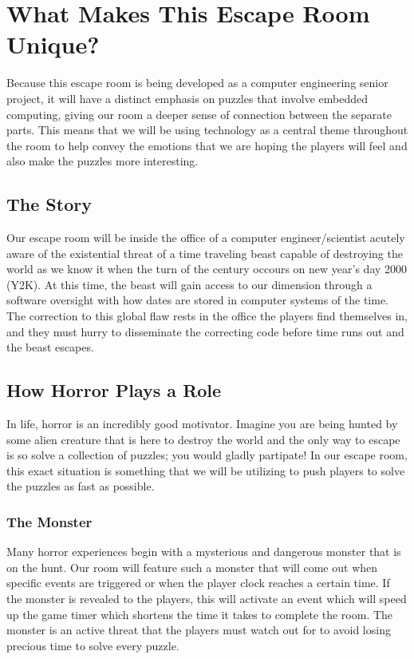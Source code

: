\documentclass[conference]{IEEEtran}
\begin{document}
\section{What Makes This Escape Room Unique?}
Because this escape room is being developed as a computer engineering senior project, it will have a distinct emphasis
on puzzles that involve embedded computing, giving our room a deeper sense of connection between the separate parts.
This means that we will be using technology as a central theme throughout the room to help convey the emotions that we
are hoping the players will feel and also make the puzzles more interesting.

\subsection*{The Story}
Our escape room will be inside the office of a computer engineer/scientist acutely aware of the existential threat 
of a time traveling beast capable of destroying the world as we know it when the turn of the century occours on 
new year's day 2000 (Y2K). At this time, the beast will gain access to our dimension through a software oversight
with how dates are stored in computer systems of the time. The correction to this global flaw rests in the office
the players find themselves in, and they must hurry to disseminate the correcting code before time runs out and the
beast escapes.

\subsection*{How Horror Plays a Role}
In life, horror is an incredibly good motivator. Imagine you are being hunted by some alien creature that is here to
destroy the world and the only way to escape is so solve a collection of puzzles; you would gladly partipate!
In our escape room, this exact situation is something that we will be utilizing to push players to solve the puzzles
as fast as possible.

\subsubsection*{The Monster}
Many horror experiences begin with a mysterious and dangerous monster that is on the hunt. Our room will feature such a monster
that will come out when specific events are triggered or when the player clock reaches a certain time.
If the monster is revealed to the players, this will activate an event which will
speed up the game timer which shortens the time it takes to complete the room. The monster is an 
active threat that the players must watch out for to avoid losing precious time to
solve every puzzle.
\end{document}
